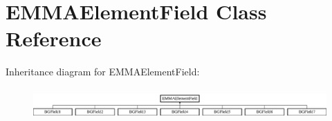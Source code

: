 \hypertarget{classEMMAElementField}{\section{E\-M\-M\-A\-Element\-Field Class Reference}
\label{classEMMAElementField}
}
Inheritance diagram for E\-M\-M\-A\-Element\-Field\-:\begin{figure}[H]
\begin{center}
\leavevmode
\includegraphics[height=1.221374cm]{classEMMAElementField}
\end{center}
\end{figure}
